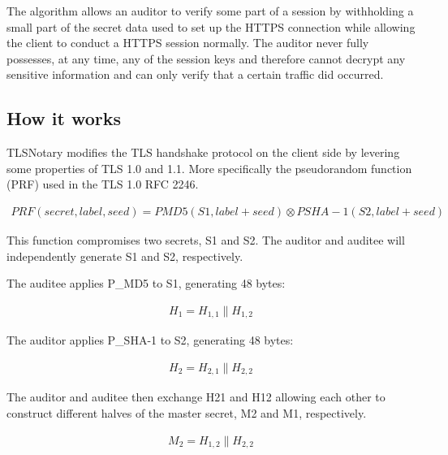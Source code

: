 The algorithm allows an auditor to verify some part of a session by withholding a small part of the secret data used to set up the HTTPS connection while allowing the client to conduct a HTTPS session normally. The auditor never fully possesses, at any time, any of the session keys and therefore cannot decrypt any sensitive information and can only verify that a certain traffic did occurred.

\subsection{How it works}
TLSNotary modifies the TLS handshake protocol on the client side by levering some properties of TLS 1.0 and 1.1. More specifically the pseudorandom function (PRF) used in the TLS 1.0 RFC 2246.

\begin{ceqn}
    \begin{align}
        PRF(secret,label,seed) = PMD5(S1,label+seed) \otimes PSHA-1(S2,label+seed)
    \end{align}
\end{ceqn}

This function compromises two secrets, S1 and S2. The auditor and auditee will independently generate S1 and S2, respectively. 

The auditee applies P\_MD5 to S1, generating 48 bytes:

\begin{ceqn}
    \begin{align}
        H_{1} = H_{1,1} \parallel H_{1,2}
    \end{align}
\end{ceqn}

The auditor applies P\_SHA-1 to S2, generating 48 bytes:

\begin{ceqn}
    \begin{align}
        H_{2} = H_{2,1} \parallel H_{2,2}
    \end{align}
\end{ceqn}


The auditor and auditee then exchange H21 and H12 allowing each other to construct different halves of the master secret, M2 and M1, respectively.

\begin{ceqn}
    \begin{align}
        M_{2} = H_{1,2} \parallel H_{2,2}
    \end{align}
\end{ceqn}

